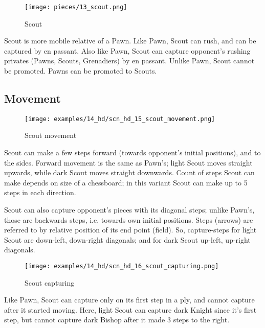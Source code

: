 \vspace*{-0.7\baselineskip}
\noindent
\begin{wrapfigure}[9]{l}{0.4\textwidth}
\centering
\texttt{[image: pieces/13\_scout.png]}
\vspace*{-1.3\baselineskip}
\caption{Scout}
\label{fig:13_scout}
\end{wrapfigure}
Scout is more mobile relative of a Pawn. Like Pawn, Scout can rush, and can be captured
by en passant. Also like Pawn, Scout can capture opponent's rushing privates (Pawns,
Scouts, Grenadiers) by en passant. Unlike Pawn, Scout cannot be promoted. Pawns can be
promoted to Scouts.

\vspace*{0.7\baselineskip}
\subsection*{Movement}
\label{sec:Hemera's Dawn/Scout/Movement}

\vspace*{-1.3\baselineskip}
\noindent
\begin{figure}[!h]
\texttt{[image: examples/14\_hd/scn\_hd\_15\_scout\_movement.png]}
\vspace*{-1.3\baselineskip}
\caption{Scout movement}
\label{fig:scn_hd_15_scout_movement}
\end{figure}

\vspace*{-0.5\baselineskip}
Scout can make a few steps forward (towards opponent's initial positions), and
to the sides. Forward movement is the same as Pawn's; light Scout moves straight
upwards, while dark Scout moves straight downwards. Count of steps Scout can make
depends on size of a chessboard; in this variant Scout can make up to 5 steps in
each direction.

\clearpage %

Scout can also capture opponent's pieces with its diagonal steps; unlike Pawn's,
those are backwards steps, i.e. towards own initial positions.\newline
\indent
Steps (arrows) are referred to by relative position of its end point (field).
So, capture-steps for light Scout are down-left, down-right diagonals; and for
dark Scout up-left, up-right diagonals.

\vspace*{-0.3\baselineskip}
\noindent
\begin{wrapfigure}[7]{l}{0.41\textwidth}
\centering
\texttt{[image: examples/14\_hd/scn\_hd\_16\_scout\_capturing.png]}
\vspace*{-0.5\baselineskip}
\caption{Scout capturing}
\label{fig:scn_hd_16_scout_capturing}
\end{wrapfigure}
Like Pawn, Scout can capture only on its first step in a ply, and cannot capture
after it started moving. Here, light Scout can capture dark Knight since it's
first step, but cannot capture dark Bishop after it made 3 steps to the right.


